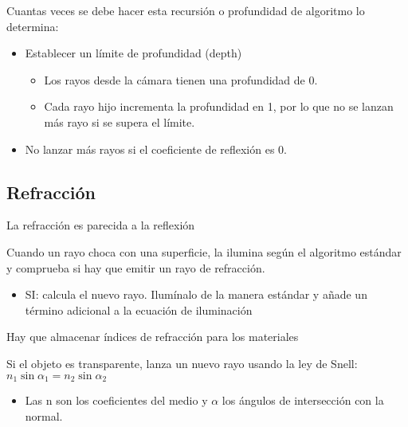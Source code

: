 Cuantas veces se debe hacer esta recursión o profundidad de algoritmo lo determina:
\begin{itemize}
    \item Establecer un límite de profundidad (depth)
        \begin{itemize}
            \item Los rayos desde la cámara tienen una profundidad de 0.
            \item Cada rayo hijo incrementa la profundidad en 1, por lo que no se lanzan más rayo si se supera el límite.
        \end{itemize}
    \item No lanzar más rayos si el coeficiente de reflexión es 0.
\end{itemize}

\subsection{Refracción}
La refracción es parecida a la reflexión

Cuando un rayo choca con una superficie, la ilumina según el algoritmo estándar y comprueba si hay que emitir un rayo de
refracción.
\begin{itemize}
    \item SI: calcula el nuevo rayo. Ilumínalo de la manera estándar y añade un término adicional a la ecuación de iluminación
\end{itemize}

Hay que almacenar índices de refracción para los materiales

Si el objeto es transparente, lanza un nuevo rayo usando la ley de Snell: $n_1 \sin \alpha_1 = n_2 \sin \alpha_2$
\begin{itemize}
    \item Las n son los coeficientes del medio y $\alpha$ los ángulos de intersección con la normal.
\end{itemize}